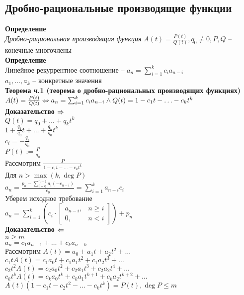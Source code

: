 \documentclass[12pt]{article}
\begin{document}
\subsection{Дробно-рациональные производящие функции}
\textbf{Определение}\\
\textit{Дробно-рациональная производящая функция} $A(t) = \frac{P(t)}{Q(t)}, q_0 \neq 0, P, Q$ -- конечные многочлены\\
\textbf{Определение}\\
Линейное рекуррентное соотношение -- $a_n = \sum_{i=1}^k c_ia_{n-i}$\\
$a_1, \ldots, a_k$ -- конкретные значения\\
\textbf{Теорема ч.1 (теорема о дробно-рациональных производящих функциях)}\\
$A(t) = \frac{P(t)}{Q(t)} \Leftrightarrow a_n = \sum_{i=1}^k c_ia_{n-i} \land Q(t) = 1-c_1t-\ldots - c_kt^k$\\
\textbf{Доказательство $\Rightarrow$}\\
$Q(t) = q_0 + \ldots + q_kt^k$\\
$1 + \frac{q_1}{q_0}t + \ldots + \frac{q_k}{q_0}t^k$\\
$c_i = -\frac{q_i}{q_0}$\\
$P(t) := \frac{P}{q_0}$\\
Рассмотрим $\frac{P}{1-c_1t - \ldots - c_kt^k}$\\
Для $n > \max(k, \deg P)$\\
$a_n = \frac{p_n - \sum_{i=0}^{n-1} a_i(-c_{n-i})}{c_0} = \sum_{i=1}^k a_{n-i}c_i$\\
Уберем исходное требование\\
$a_n = \sum_{i=1}^k (c_i\cdot \left[\begin{array}{cc}
    a_{n-i},& n \geq i\\
    0,& n < i
\end{array}\right]) + p_n$\\
\textbf{Доказательство $\Leftarrow$}\\
$n \geq m$\\
$a_n = c_1a_{n-1} + \ldots + c_ka_{n-k}$\\
Рассмотрим $A(t) = a_0 + a_1t + a_2t^2 + \ldots$\\
$c_1t A(t) = c_1a_0t + c_1a_1t^2 + c_1a_2t^3 + \ldots$\\
$c_2t^2 A(t) = c_2a_0t^2 + c_2a_1t^3 + c_2a_2t^4 + \ldots$\\
$c_kt^k A(t) = c_ka_0t^k + c_ka_1t^{k+1} + c_ka_2t^{k+2} + \ldots$\\
$A(t)(1-c_1t-c_2t^2 - \ldots - c_kt^k) = P(t), \deg P \leq m$\\
\end{document}
